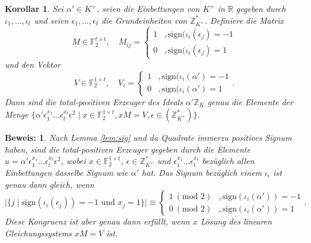 \documentclass[12pt,a4paper,halfparskip,headsepline,bibtotocnumbered]{scrreprt}
\theoremstyle{nummermitklammern}
\newtheorem{korollar}[defsatzusw]{Korollar}
\theoremstyle{nonumberbreak}
\newtheorem{beweis}{Beweis:}
\newcommand{\Z}{\mathbb{Z}}
\newcommand{\R}{\mathbb{R}}
\newcommand{\F}{\mathbb{F}}
\begin{document}
\begin{framed}
	\begin{korollar}
		Sei $\alpha' \in K^+$, seien die Einbettungen von $K^+$ in $\R$ gegeben durch $\iota_1, \dots, \iota_{t}$ und seien $\epsilon_1, \dots, \epsilon_t$ die Grundeinheiten von $\Z_{K^+}^\ast$. 				Definiere die Matrix
		\begin{equation*}
			M \in \F_2^{t \times t}, \quad M_{ij} = \begin{cases} 1 &, \text{sign}(\iota_i(\epsilon_j) = -1\\ 0 &, \text{sign}(\iota_i(\epsilon_j) = 1\end{cases}
		\end{equation*}
		und den Vektor
		\begin{equation*}
			V \in \F_2^{1 \times t}, \quad V_i = \begin{cases} 1 &, \text{sign}(\iota_i(\alpha') = -1\\ 0 &, \text{sign}(\iota_i(\alpha') = 1\end{cases}.
		\end{equation*}
		Dann sind die total-positiven Erzeuger des Ideals $\alpha' \Z_K$ genau die Elemente der Menge $\lbrace \alpha' \epsilon_1^{x_1} \dots \epsilon_t^{x_t} \epsilon^2 \mid x \in \F_2^{1 \times t}, x M = V, \epsilon \in (\Z_{K^+}^\ast) \rbrace$.
	\end{korollar}
\end{framed}

\begin{beweis}
	Nach Lemma \eqref{lem:sig} und da Quadrate immerzu positives Signum haben, sind die total-positiven Erzeuger gegeben durch die Elemente $u = \alpha' \epsilon_1^{x_1} \dots \epsilon_t^{x_t} \epsilon^2$, wobei $x \in \F_2^{1 \times t}$, $\epsilon \in \Z_{K^+}^\ast$ und $\epsilon_1^{x_1} \dots \epsilon_t^{x_t}$ bezüglich allen Einbettungen dasselbe Signum wie $\alpha'$ hat. Das Signum bezüglich einem $\iota_i$ ist genau dann gleich, wenn
	\begin{equation*}
		\vert \lbrace j \mid \text{sign}(\iota_i(\epsilon_j)) = -1 \text{ und } x_j = 1 \rbrace \vert \equiv \begin{cases} 1 \ (\text{mod } 2) &,\text{sign}(\iota_i(\alpha')) = -1 \\ 0 \ (\text{mod } 2) &,\text{sign}(\iota_i(\alpha')) = 1 \end{cases}.
	\end{equation*}
	Diese Kongruenz ist aber genau dann erfüllt, wenn $x$ Lösung des linearen Gleichungssystems $xM = V$ ist.
\end{beweis}
\end{document}
